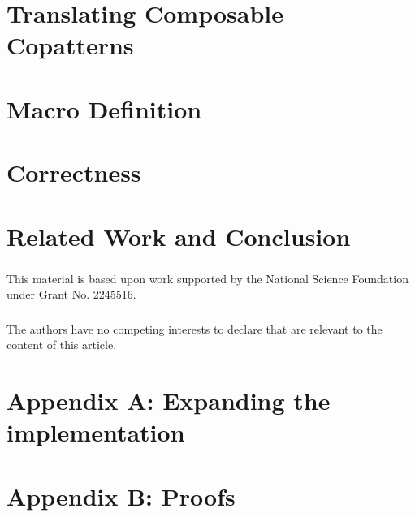 \documentclass[runningheads]{llncs}
\begin{document}
\section{Translating Composable Copatterns} \label{sec-translation}



\section{Macro Definition} \label{sec-macro}



\section{Correctness} \label{sec-correctness}




% 

\section{Related Work and Conclusion} \label{sec-related-work}






\begin{credits}
\subsubsection{\ackname}
% 
This material is based upon work supported by the National Science Foundation
under Grant No. 2245516.

\subsubsection{\discintname}
%
The authors have no competing interests to declare that are
relevant to the content of this article.
\end{credits}
%
%
%

% 


\newpage

\section{Appendix A: Expanding the implementation}


\section{Appendix B: Proofs}

\end{document}

